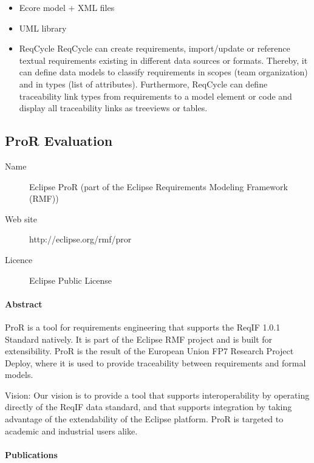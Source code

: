 \begin{itemize}
\item Ecore model + XML  files
\item UML library
\item ReqCycle
ReqCycle can create requirements, import/update or reference textual requirements existing in different data sources or formats. Thereby, it can define data models to classify requirements in scopes (team organization) and in types (list of attributes). Furthermore, ReqCycle can define traceability link types from requirements to a model element or code and display all traceability links as treeviews or tables.
\end{itemize}


\subsection{ProR Evaluation}

\begin{description}
\item[Name] Eclipse ProR (part of the Eclipse Requirements Modeling Framework (RMF))
\item[Web site] http://eclipse.org/rmf/pror
\item[Licence] Eclipse Public License
\end{description} 

\paragraph{Abstract}

ProR is a tool for requirements engineering that supports the ReqIF 1.0.1 Standard natively. It is part of the Eclipse RMF project and is built for extensibility. ProR is the result of the European Union FP7 Research Project Deploy, where it is used to provide traceability between requirements and formal models.

Vision: Our vision is to provide a tool that supports interoperability by operating directly of the ReqIF data standard, and that supports integration by taking advantage of the extendability of the Eclipse platform. ProR is targeted to academic and industrial users alike. 

\paragraph{Publications}

